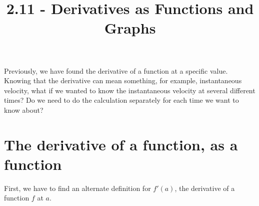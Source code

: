 \documentclass{ximera}
\title{2.11 - Derivatives as Functions and Graphs}
\begin{document}
\begin{abstract}
\end{abstract}
\maketitle

Previously, we have found the derivative of a function at a specific value. Knowing that the derivative can mean something, for example, instantaneous velocity, what if we wanted to know the instantaneous velocity at several different times? Do we need to do the calculation separately for each time we want to know about?

\section{The derivative of a function, as a function}

First, we have to find an alternate definition for $f'(a)$, the derivative of a function $f$  at $a$.
\end{document}
